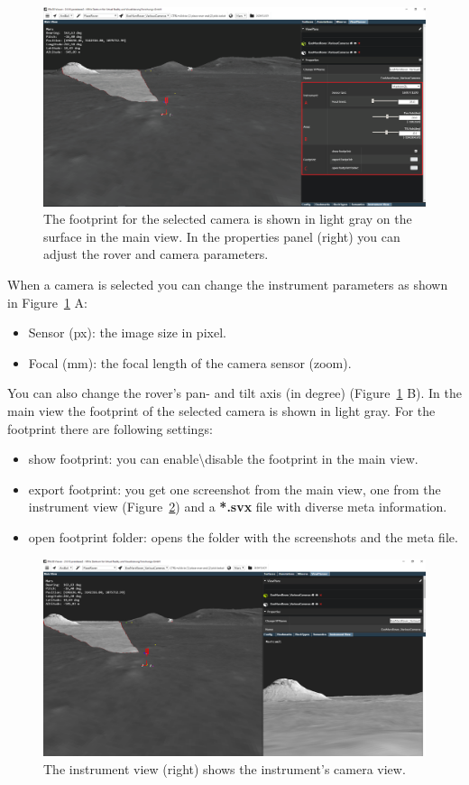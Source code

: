 \begin{figure}[h]
    	\centering
    		\includegraphics[width=1\textwidth]{pics/ViewPlannerGuiAi.png}
    	\caption[View PlannerGui]{The footprint for the selected camera is shown in light gray on the surface in the main view. In the properties panel (right) you can adjust the rover and camera parameters.}
    	\label{fig:viewPlannerGui}
   \end{figure}
When a camera is selected you can change the instrument parameters as shown in Figure~\ref{fig:viewPlannerGui} A:
\begin{itemize}
	\item Sensor (px): the image size in pixel.
	\item Focal (mm): the focal length of the camera sensor (zoom).
\end{itemize}
You can also change the rover's pan- and tilt axis (in degree) (Figure~\ref{fig:viewPlannerGui} B).
In the main view the footprint of the selected camera is shown in light gray. For the footprint there are following settings:
\begin{itemize}
	\item show footprint: you can enable\textbackslash disable the footprint in the main view.
	\item export footprint: you get one screenshot from the main view, one from the instrument view (Figure~\ref{fig:instView}) and a \textbf{*.svx} file with diverse meta information.
	\item open footprint folder: opens the folder with the screenshots and the meta file.
\end{itemize}
\begin{figure}[h]
    	\centering
    		\includegraphics[width=1\textwidth]{pics/InstrumentView.png}
    	\caption[Instrument View]{The instrument view (right) shows the instrument's camera view.}
    	\label{fig:instView}
   \end{figure}